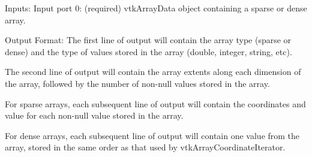 Inputs\-: Input port 0\-: (required) vtk\-Array\-Data object containing a sparse or dense array.

Output Format\-: The first line of output will contain the array type (sparse or dense) and the type of values stored in the array (double, integer, string, etc).

The second line of output will contain the array extents along each dimension of the array, followed by the number of non-\/null values stored in the array.

For sparse arrays, each subsequent line of output will contain the coordinates and value for each non-\/null value stored in the array.

For dense arrays, each subsequent line of output will contain one value from the array, stored in the same order as that used by vtk\-Array\-Coordinate\-Iterator.

